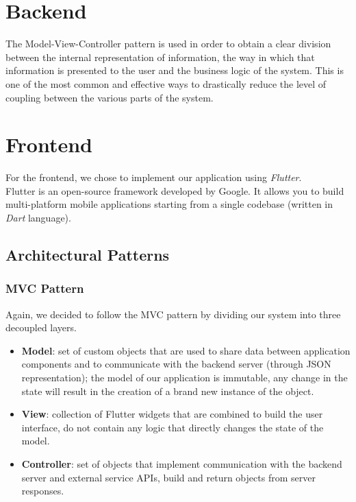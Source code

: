 \section{Backend}

The Model-View-Controller pattern is used in order to obtain a clear division between the internal representation of information, the way in which that information is presented to the user and the business logic of the system.
This is one of the most common and effective ways to drastically reduce the level of coupling between the various parts of the system.

\section{Frontend}
For the frontend, we chose to implement our application using \emph{Flutter}.\\
Flutter is an open-source framework developed by Google.
It allows you to build multi-platform mobile applications starting from a single codebase (written in \emph{Dart} language).

\subsection{Architectural Patterns}

\subsubsection{MVC Pattern}
Again, we decided to follow the MVC pattern by dividing our system into three decoupled layers.
\begin{itemize}
    \item \textbf{Model}:
          set of custom objects that are used to share data between application components and to communicate with the backend server (through JSON representation);
          the model of our application is immutable, any change in the state will result in the creation of a brand new instance of the object.
    \item \textbf{View}:
          collection of Flutter widgets that are combined to build the user interface, do not contain any logic that directly changes the state of the model.
    \item \textbf{Controller}:
          set of objects that implement communication with the backend server and external service APIs, build and return objects from server responses.
\end{itemize}


